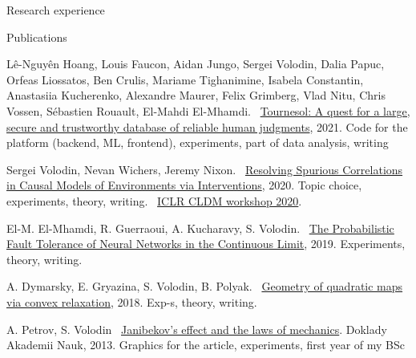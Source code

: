 \documentclass{resume} %
\newcommand*{\mybold}[1]{{\color{pinkunderline} #1}}
\newcommand*{\logo}[1]{%
	\raisebox{-.02\baselineskip}{%
		\texttt{[image: ./img/\\imgpref\#1]}%
	}%
}
\def\imgpref{bleak-}
\newcommand{\mylink}{{\color{gray}\faExternalLink}}
\begin{document}
\begin{rSection}{Research experience}
\end{rSection}



\begin{rSection}{Publications}
\vspace{-1em}
\item L\^{e}-Nguy\^{e}n Hoang, Louis Faucon, Aidan Jungo, \mybold{Sergei Volodin,} Dalia Papuc, Orfeas Liossatos, Ben Crulis, Mariame Tighanimine, Isabela Constantin, Anastasiia Kucherenko, Alexandre Maurer, Felix Grimberg, Vlad Nitu, Chris Vossen, Sébastien Rouault, El-Mahdi El-Mhamdi. \mylink~\href{https://arxiv.org/abs/2107.07334}{Tournesol: A quest for a large, secure and trustworthy database of reliable human judgments}, 2021. Code for the platform (backend, ML, frontend), experiments, part of data analysis, writing
\item \logo{iclr.png} \mybold{Sergei Volodin,} Nevan Wichers, Jeremy Nixon. \mylink~\href{https://arxiv.org/abs/2002.05217}{Resolving Spurious Correlations in Causal Models of Environments via Interventions}, 2020. Topic choice, experiments, theory, writing. \mylink~\href{https://causalrlworkshop.github.io/program/cldm_8.html}{ICLR CLDM workshop 2020}.
\item El-M. El-Mhamdi, R. Guerraoui, A. Kucharavy, \mybold{S. Volodin.} \mylink~\href{https://arxiv.org/abs/1902.01686}{The Probabilistic Fault Tolerance of Neural Networks in the Continuous Limit}, 2019. Experiments, theory,  writing. %
\item A. Dymarsky, E. Gryazina, \mybold{S. Volodin}, B. Polyak. \mylink~\href{https://arxiv.org/abs/1810.00896}{Geometry of quadratic maps via convex relaxation}, 2018. Exp-s, theory, writing.%
\item A. Petrov, \mybold{S. Volodin} \mylink~\href{https://link.springer.com/article/10.1134/S1028335813080041}{Janibekov's effect and the laws of mechanics}. Doklady Akademii Nauk, 2013. Graphics for the article, experiments, first year of my BSc
\end{rSection}
\end{document}
